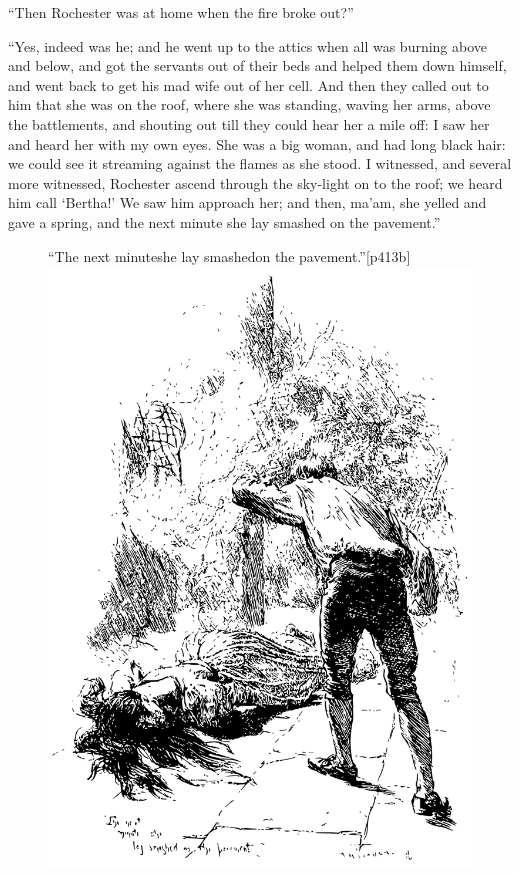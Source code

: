 \enquote{Then \Mr{} Rochester was at home when the fire broke out?}

\enquote{Yes, indeed was he; and he went up to the attics when all was
	burning above and below, and got the servants out of their beds and
	helped them down himself, and went back to get his mad wife out of her
	cell. And then they called out to him that she was on the roof, where
	she was standing, waving her arms, above the battlements, and shouting
	out till they could hear her a mile off: I saw her and heard her with my
	own eyes. She was a big woman, and had long black hair: we could see it
	streaming against the flames as she stood. I witnessed, and several
	more witnessed, \Mr{} Rochester ascend through the sky-light on to the
	roof; we heard him call \enquote{Bertha!} We saw him approach her; and
	then, ma'am, she yelled and gave a spring, and the next minute she lay
	smashed on the pavement.}

\begin{figure}
	\begin{sidecaption}{\enquote{The next minute\linebreak she lay smashed\linebreak on the pavement.}}[p413b]
		\centering
		\includegraphics[width=\linewidth]{images/p413b.pdf}
	\end{sidecaption}
\end{figure}

